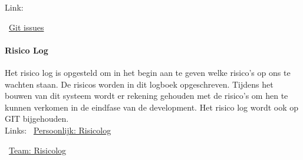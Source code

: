\documentclass{article}
\begin{document}
Link:

\MVAt~\href{https://github.com/Gewad/Project4Bankalicious/issues}{Git issues}

\paragraph{Risico Log}
Het risico log is opgesteld om in het begin aan te geven
welke risico's op ons te wachten staan.
De risicos worden in dit logboek opgeschreven.
Tijdens het bouwen van dit systeem wordt er rekening gehouden met de risico's
om hen te kunnen verkomen in de eindfase van de development.
Het risico log wordt ook op GIT bijgehouden.\\

Links:
\MVAt~\href{https://github.com/Gewad/Project4Bankalicious/blob/test/opdrachten/opdracht_h/opdracht_h_wondel/opdracht_h.pdf}{Persoonlijk: Risicolog}

\MVAt~\href{https://github.com/Gewad/Project4Bankalicious/blob/test/opdrachten/opdracht_hj/opdracht_h_teamonderdeel.xlsx}{Team: Risicolog}
\end{document}
